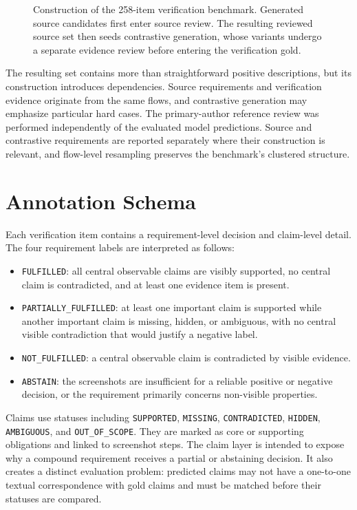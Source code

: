 \begin{figure}[htbp]
  \centering
  \resizebox{\textwidth}{!}{}
  \caption{Construction of the 258-item verification benchmark. Generated
  source candidates first enter source review. The resulting reviewed source
  set then seeds contrastive generation, whose variants undergo a separate
  evidence review before entering the verification gold.}
  \label{fig:benchmark-construction-funnel}
\end{figure}

The resulting set contains more than straightforward positive descriptions, but
its construction introduces dependencies. Source requirements and verification
evidence originate from the same flows, and contrastive generation may
emphasize particular hard cases. The primary-author reference review was
performed independently of the evaluated model predictions. Source and
contrastive requirements are reported separately where their construction is
relevant, and flow-level resampling preserves the benchmark's clustered
structure.

\section{Annotation Schema}\label{annotation-schema}

Each verification item contains a requirement-level decision and claim-level detail. The four requirement labels are interpreted as follows:

\begin{itemize}
\tightlist
\item
  \texttt{FULFILLED}: all central observable claims are visibly supported, no central claim is contradicted, and at least one evidence item is present.
\item
  \texttt{PARTIALLY\_\allowbreak FULFILLED}: at least one important claim is supported while another important claim is missing, hidden, or ambiguous, with no central visible contradiction that would justify a negative label.
\item
  \texttt{NOT\_FULFILLED}: a central observable claim is contradicted by visible evidence.
\item
  \texttt{ABSTAIN}: the screenshots are insufficient for a reliable positive or negative decision, or the requirement primarily concerns non-visible properties.
\end{itemize}

Claims use statuses including \texttt{SUPPORTED}, \texttt{MISSING}, \texttt{CONTRADICTED}, \texttt{HIDDEN}, \texttt{AMBIGUOUS}, and \texttt{OUT\_OF\_SCOPE}. They are marked as core or supporting obligations and linked to screenshot steps. The claim layer is intended to expose why a compound requirement receives a partial or abstaining decision. It also creates a distinct evaluation problem: predicted claims may not have a one-to-one textual correspondence with gold claims and must be matched before their statuses are compared.

